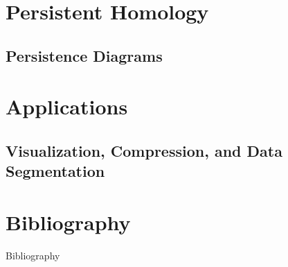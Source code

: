 \section[Persistence]{Persistent Homology}
\subsection{Persistence Diagrams}
\begin{frame}
	\href{https://www.youtube.com/embed/h0bnG1Wavag?start=285&end=302&mute=1}{}
\end{frame}

\section{Applications}
\subsection{Visualization, Compression, and Data Segmentation}
\begin{frame}
\end{frame}

\section*{Bibliography}
\begin{frame}{Bibliography}
	\nocite{wagner}
	\nocite{hatcher}
	\nocite{fraleigha}
	\begingroup
	\renewcommand{\section}[2]{}%
	
	\endgroup
\end{frame}






